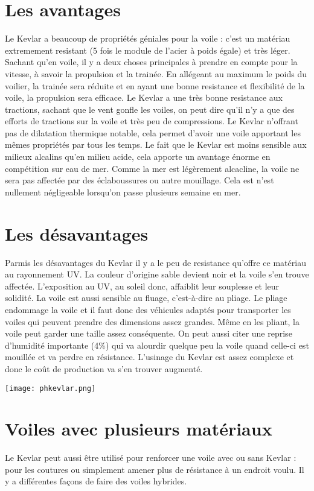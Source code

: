\begin{multicols}{2}
\section{Les avantages}
Le Kevlar a beaucoup de propriétés géniales pour la voile :  c’est un matériau extremement resistant   (5 fois le module de l’acier à poids égale) et très léger.  Sachant qu’en voile, il y a deux choses principales à prendre en compte pour la vitesse, à savoir la propulsion et la trainée.  En allégeant au maximum le poids du voilier, la trainée sera réduite et en ayant une bonne resistance et flexibilité de la voile, la propulsion sera efficace.  Le Kevlar a une très bonne resistance aux tractions, sachant que le vent gonfle les voiles, on peut dire qu’il n’y a que des efforts de tractions sur la voile et très peu de compressions.  Le Kevlar n’offrant pas de dilatation thermique notable, cela permet d’avoir une voile apportant les mêmes propriétés par tous les temps.  Le fait que le Kevlar est moins sensible aux milieux alcalins qu’en milieu acide, cela apporte un avantage énorme en compétition sur eau de mer.  Comme la mer est légèrement alcacline, la voile ne sera pas affectée par des éclaboussures ou autre mouillage.  Cela est n’est nullement négligeable lorsqu’on passe plusieurs semaine en mer. 

\section{Les désavantages}
Parmis les désavantages du Kevlar il y a le peu de resistance qu’offre ce matériau au rayonnement UV.  La couleur d’origine sable devient noir et la voile s’en trouve affectée. L’exposition au UV, au soleil donc, affaiblit leur souplesse et leur solidité.  La voile est aussi sensible au fluage, c’est-à-dire au pliage.  Le pliage endommage la voile et il faut donc des véhicules adaptés pour transporter les voiles qui peuvent prendre des dimensions assez grandes.  Même en les pliant, la voile peut garder une taille assez conséquente.  On peut aussi citer une reprise d’humidité importante (4\%) qui va alourdir quelque peu la voile quand celle-ci est mouillée et va perdre en résistance.  L’usinage du Kevlar est assez complexe et donc le coût de production va s’en trouver augmenté.


	\begin{center}
		\texttt{[image: phkevlar.png]}  
	\end{center}
	

\section{Voiles avec plusieurs matériaux}
Le Kevlar peut aussi être utilisé pour renforcer une voile avec ou sans Kevlar : pour les coutures ou simplement amener plus de résistance à un endroit voulu.  Il y a différentes façons de faire des voiles hybrides.

\end{multicols}
